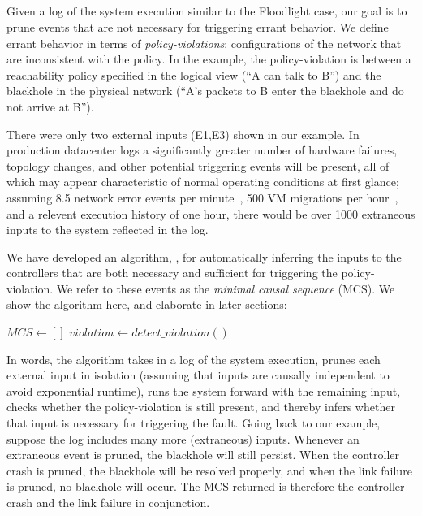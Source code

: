 \subsection{\SIMULATOR{}}
\label{sec:causal_analysis}

Given a log of the system execution similar to the Floodlight case,
our goal is to prune events that are not
necessary for triggering errant behavior. We define errant behavior in terms of {\em policy-violations}:
configurations of the network that are inconsistent
with the policy. In the example, the policy-violation is between a
reachability policy specified in the logical view (``A can talk to B'')
and the blackhole in the physical network (``A's packets to B enter the
blackhole and do not arrive at B'').

There were only two external inputs (E1,E3) shown in our example.
In production datacenter logs
a significantly greater number of hardware failures, topology changes,
and other potential triggering events will be present,
all of which may appear characteristic of normal operating
conditions at first glance; assuming 8.5 network error events per
minute~\cite{Greenberg:2009:VSF:1592568.1592576}, 500 VM migrations per
hour~\cite{Soundararajan:2010:CBS:1899928.1899941}, and a relevent execution
history of one hour, there would be over 1000 extraneous inputs to the system
reflected in the log.

We have developed an algorithm, \simulator{}, for automatically inferring the inputs to the
controllers that are both necessary and sufficient for triggering the policy-violation. We
refer to these events as the {\em minimal causal sequence} (MCS). We show
the algorithm here, and elaborate in later sections:

\begin{algorithmic}
\State $MCS \gets []$
    \State $violation \gets detect\_violation()$
    \EndIf
\EndFor
\end{algorithmic}

\noindent In words, the algorithm takes in a log of the system execution,
prunes each external input in isolation (assuming that inputs are causally
independent to avoid exponential runtime),
runs the system forward with the remaining input, checks whether the
policy-violation is still present, and thereby infers whether that input is
necessary for triggering the fault. Going back to our example, suppose the
log includes many more (extraneous) inputs. Whenever an
extraneous event is pruned, the blackhole will still persist. When
the controller crash is pruned, the blackhole will be resolved properly, and
when the link failure is pruned, no blackhole will occur. The MCS returned
is therefore the controller crash and the link failure in conjunction.

